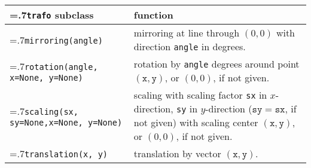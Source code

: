\medskip
\begin{tabularx}{\linewidth}{>{\hsize=.7\hsize}X>{\raggedright\arraybackslash\hsize=1.3\hsize}X}
  \texttt{trafo} subclass & function \\
  \hline 
  \texttt{mirroring(angle)} & mirroring at line through $(0,0)$
  with direction  \texttt{angle} in degrees.\\
  \texttt{rotation(angle, \newline\phantom{rotation(}x=None, y=None)} &
  rotation by \texttt{angle} degrees around point $(\mathtt{x},
  \mathtt{y})$, or $(0,0)$, if not given.\\
  \texttt{scaling(sx, sy=None,\newline\phantom{scaling(}x=None, y=None)} &
  scaling with scaling factor \texttt{sx} in $x$-direction,
  \texttt{sy} in $y$-direction ($\mathtt{sy}=\mathtt{sx}$, if not
  given) with scaling
  center $(\mathtt{x}, \mathtt{y})$, or $(0,0)$, if not given.\\
  \texttt{translation(x, y)} &
  translation by vector $(\mathtt{x}, \mathtt{y})$.\\
\end{tabularx}
\medskip





